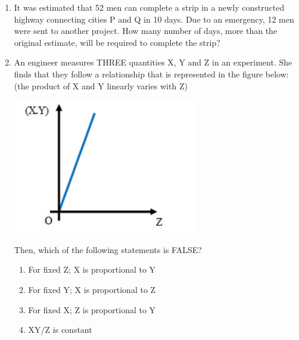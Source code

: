 \documentclass[12pt,onecolumn]{article}
\begin{document}
\begin{enumerate}
    \item It was estimated that 52 men can complete a strip in a newly constructed highway connecting cities P and Q in 10 days. Due to an emergency, 12 men were sent to another project. How many number of days, more than the original estimate, will be required to complete the strip?
          \begin{enumerate}
          \end{enumerate}

    \item An engineer measures THREE quantities X, Y and Z in an experiment. She finds that they follow a relationship that is represented in the figure below: (the product of X and Y linearly varies with Z)
          \begin{center}
              \includegraphics[scale=0.5]{q9s2}
          \end{center}
          Then, which of the following statements is FALSE?
          \begin{enumerate}
              \item For fixed Z; X is proportional to Y
              \item For fixed Y; X is proportional to Z
              \item For fixed X; Z is proportional to Y
              \item XY/Z is constant
          \end{enumerate}


\end{enumerate}
\end{document}
